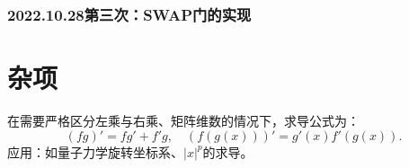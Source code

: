 \documentclass[
fontsetup = font-setup-open.tex,
titlesetup = titles-setup.tex
]{AJbook}
\numberwithin{equation}{section}
\begin{document}
\section[2022.10.28第三次]{2022.10.28第三次：SWAP门的实现}
\part{杂项}
在需要严格区分左乘与右乘、矩阵维数的情况下，求导公式为：
\begin{equation}\label{key}
(fg)'=fg'+f'g,\quad (f(g(x)))'=g'(x)f'(g(x)).
\end{equation}
应用：如量子力学旋转坐标系、$ |x|^p $的求导。
\appendix

\backmatter
\printbibliography[heading=bibintoc]

\listoffigures
\listoftables

{\footnotesize
{}
\printindex}
\end{document}

